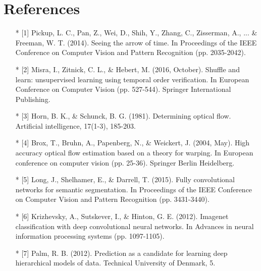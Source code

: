 \documentclass[10pt,a4paper]{report}
\begin{document}
		\section*{References}
		\scriptsize{
		\begin{itemize}
			
			\item[*] [1] Pickup, L. C., Pan, Z., Wei, D., Shih, Y., Zhang, C., Zisserman, A., ... \& Freeman, W. T. (2014). Seeing the arrow of time. In Proceedings of the IEEE Conference on Computer Vision and Pattern Recognition (pp. 2035-2042).
			
			\item[*] [2] Misra, I., Zitnick, C. L., \& Hebert, M. (2016, October). Shuffle and learn: unsupervised learning using temporal order verification. In European Conference on Computer Vision (pp. 527-544). Springer International Publishing.
			
			\item[*] [3] Horn, B. K., \& Schunck, B. G. (1981). Determining optical flow. Artificial intelligence, 17(1-3), 185-203.
			
			\item[*] [4] Brox, T., Bruhn, A., Papenberg, N., \& Weickert, J. (2004, May). High accuracy optical flow estimation based on a theory for warping. In European conference on computer vision (pp. 25-36). Springer Berlin Heidelberg.
			
			\item[*] [5] Long, J., Shelhamer, E., \& Darrell, T. (2015). Fully convolutional networks for semantic segmentation. In Proceedings of the IEEE Conference on Computer Vision and Pattern Recognition (pp. 3431-3440).
			
			\item[*] [6] Krizhevsky, A., Sutskever, I., \& Hinton, G. E. (2012). Imagenet classification with deep convolutional neural networks. In Advances in neural information processing systems (pp. 1097-1105).
			
			\item[*] [7] Palm, R. B. (2012). Prediction as a candidate for learning deep hierarchical models of data. Technical University of Denmark, 5.
			
		\end{itemize}
	}
	
\end{document}
